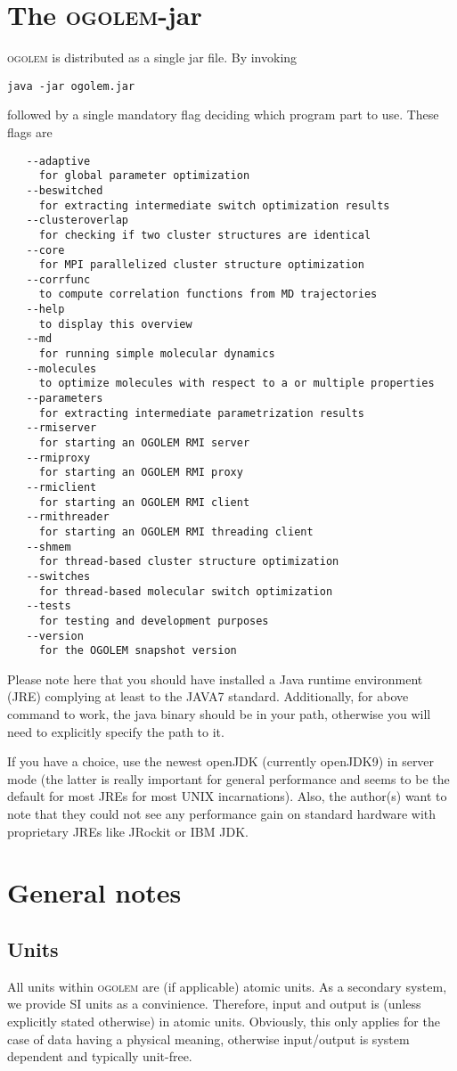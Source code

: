 \documentclass[a4paper,10pt]{scrbook}
\newcommand{\ogo}{\textsc{ogolem}}
\begin{document}
\section{The \ogo{}-jar}
\ogo{} is distributed as a single jar file. By invoking
\begin{verbatim}
java -jar ogolem.jar
\end{verbatim}
followed by a single mandatory flag deciding which program part to use. These
flags are
\begin{verbatim}
   --adaptive
     for global parameter optimization
   --beswitched
     for extracting intermediate switch optimization results
   --clusteroverlap
     for checking if two cluster structures are identical
   --core
     for MPI parallelized cluster structure optimization
   --corrfunc
     to compute correlation functions from MD trajectories
   --help
     to display this overview
   --md
     for running simple molecular dynamics
   --molecules
     to optimize molecules with respect to a or multiple properties
   --parameters
     for extracting intermediate parametrization results
   --rmiserver
     for starting an OGOLEM RMI server
   --rmiproxy
     for starting an OGOLEM RMI proxy
   --rmiclient
     for starting an OGOLEM RMI client
   --rmithreader
     for starting an OGOLEM RMI threading client
   --shmem
     for thread-based cluster structure optimization
   --switches
     for thread-based molecular switch optimization
   --tests
     for testing and development purposes
   --version
     for the OGOLEM snapshot version
\end{verbatim}
Please note here that you should have installed a Java runtime environment (JRE)
complying at least to the JAVA7 standard. Additionally, for above command to
work, the java binary should be in your path, otherwise you will need to
explicitly specify the path to it.

If you have a choice, use the newest openJDK (currently openJDK9) in server mode
(the latter is really important for general performance and seems to be the
default for most JREs for most UNIX incarnations). Also, the author(s) want to
note that they could not see any performance gain on standard hardware
with proprietary JREs like JRockit or IBM JDK.

\section{General notes}
\subsection{Units}
All units within \ogo{} are (if applicable) atomic units. As a secondary system,
we provide SI units as a convinience. Therefore, input and output is (unless 
explicitly
stated otherwise) in atomic units. Obviously, this only applies for the case of 
data
having a physical meaning, otherwise input/output is system dependent and 
typically
unit-free.
\end{document}
